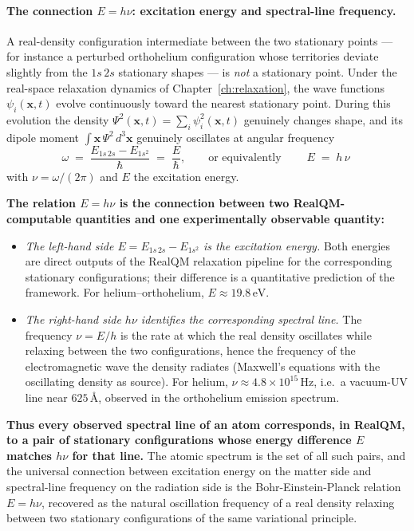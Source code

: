 \paragraph{The connection $E = h\nu$: excitation energy and spectral-line frequency.}
A real-density configuration intermediate between the two stationary points --- for instance a perturbed orthohelium configuration whose territories deviate slightly from the $1s\,2s$ stationary shapes --- is \emph{not} a stationary point. Under the real-space relaxation dynamics of Chapter~\ref{ch:relaxation}, the wave functions $\psi_i(\mathbf{x}, t)$ evolve continuously toward the nearest stationary point. During this evolution the density $\Psi^2(\mathbf{x}, t) = \sum_i \psi_i^2(\mathbf{x}, t)$ genuinely changes shape, and its dipole moment $\int \mathbf{x}\, \Psi^2\, d^3\mathbf{x}$ genuinely oscillates at angular frequency
\begin{equation}\label{eq:bohr-frequency}
\omega \;=\; \frac{E_{1s\,2s} - E_{1s^2}}{\hbar} \;=\; \frac{E}{\hbar},
\qquad\text{or equivalently}\qquad
\boxed{\;E \;=\; h\,\nu\;}
\end{equation}
with $\nu = \omega/(2\pi)$ and $E$ the excitation energy.

\textbf{The relation $E = h\nu$ is the connection between two RealQM-computable quantities and one experimentally observable quantity:}
\begin{itemize}
\item \emph{The left-hand side $E = E_{1s\,2s} - E_{1s^2}$ is the excitation energy.} Both energies are direct outputs of the RealQM relaxation pipeline for the corresponding stationary configurations; their difference is a quantitative prediction of the framework. For helium--orthohelium, $E \approx 19.8\,\mathrm{eV}$.
\item \emph{The right-hand side $h\nu$ identifies the corresponding spectral line.} The frequency $\nu = E / h$ is the rate at which the real density oscillates while relaxing between the two configurations, hence the frequency of the electromagnetic wave the density radiates (Maxwell's equations with the oscillating density as source). For helium, $\nu \approx 4.8 \times 10^{15}\,\mathrm{Hz}$, i.e.\ a vacuum-UV line near $625\,\text{\AA}$, observed in the orthohelium emission spectrum.
\end{itemize}
\textbf{Thus every observed spectral line of an atom corresponds, in RealQM, to a pair of stationary configurations whose energy difference $E$ matches $h\nu$ for that line.} The atomic spectrum is the set of all such pairs, and the universal connection between excitation energy on the matter side and spectral-line frequency on the radiation side is the Bohr-Einstein-Planck relation $E = h\nu$, recovered as the natural oscillation frequency of a real density relaxing between two stationary configurations of the same variational principle.

